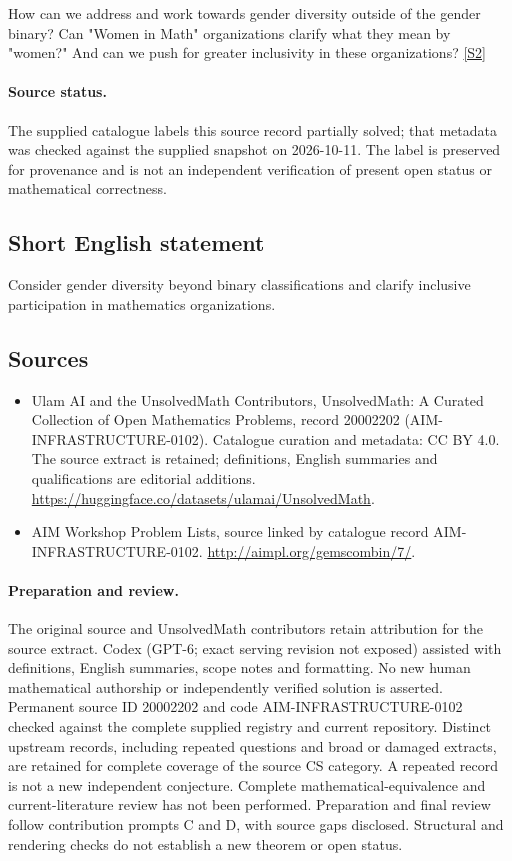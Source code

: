 \documentclass[11pt]{article}
\newcommand{\sref}[2]{\hyperlink{source:#1:#2}{[S#2]}}
\begin{document}
How can we address and work towards gender diversity outside of the gender binary? Can "Women in Math" organizations clarify what they mean by "women?" And can we push for greater inclusivity in these organizations? \sref{20002202}{2}
\paragraph{Source status.}
The supplied catalogue labels this source record partially solved; that metadata was checked against the supplied snapshot on 2026-10-11. The label is preserved for provenance and is not an independent verification of present open status or mathematical correctness.
\subsection{Short English statement}
Consider gender diversity beyond binary classifications and clarify inclusive participation in mathematics organizations.
\subsection{Sources}
\begin{itemize}
\item[\hypertarget{source:20002202:1}{S1}] Ulam AI and the UnsolvedMath Contributors, UnsolvedMath: A Curated Collection of Open Mathematics Problems, record 20002202 (AIM-INFRASTRUCTURE-0102). Catalogue curation and metadata: CC BY 4.0. The source extract is retained; definitions, English summaries and qualifications are editorial additions.
\url{https://huggingface.co/datasets/ulamai/UnsolvedMath}.
\item[\hypertarget{source:20002202:2}{S2}] AIM Workshop Problem Lists, source linked by catalogue record AIM-INFRASTRUCTURE-0102.
\url{http://aimpl.org/gemscombin/7/}.
\end{itemize}
\paragraph{Preparation and review.}
The original source and UnsolvedMath contributors retain attribution for the source extract. Codex (GPT-6; exact serving revision not exposed) assisted with definitions, English summaries, scope notes and formatting. No new human mathematical authorship or independently verified solution is asserted. Permanent source ID 20002202 and code AIM-INFRASTRUCTURE-0102 checked against the complete supplied registry and current repository. Distinct upstream records, including repeated questions and broad or damaged extracts, are retained for complete coverage of the source CS category. A repeated record is not a new independent conjecture. Complete mathematical-equivalence and current-literature review has not been performed. Preparation and final review follow contribution prompts C and D, with source gaps disclosed. Structural and rendering checks do not establish a new theorem or open status.
\label{end:20002202}
\end{document}
